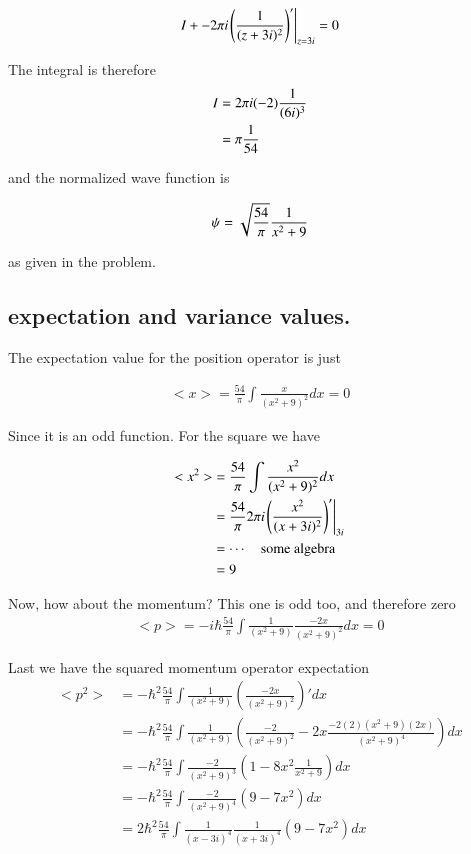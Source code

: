 \documentclass{article}
\begin{document}
\begin{align*}
I + -2 \pi i {\left.\left(\frac{1}{(z + 3i)^2}\right)'\right\vert}_{z=3i} = 0
\end{align*}

The integral is therefore
\begin{align*}
I 
&= 2 \pi i (-2)\frac{1}{(6i)^3} \\
&= \pi \frac{1}{54} \\
\end{align*}

and the normalized wave function is 

\begin{align*}
\psi = \sqrt{\frac{54}{\pi}}\frac{1}{x^2 + 9}
\end{align*}

as given in the problem.

\subsection{ expectation and variance values. }

The expectation value for the position operator is just

\begin{align*}
<x> = \frac{54}{\pi} \int \frac{x}{(x^2 + 9)^2} dx = 0
\end{align*}

Since it is an odd function.  For the square we have

\begin{align*}
<x^2>
&= \frac{54}{\pi} \int \frac{x^2}{(x^2 + 9)^2} dx \\
&= \frac{54}{\pi} 2 \pi i {\left.\left(\frac{x^2}{(x + 3i)^2}\right)'\right\vert}_{3i} \\
&= \cdots \quad \mbox{\text{some algebra}} \\
&= 9
\end{align*}

Now, how about the momentum?  This one is odd too, and therefore zero
\begin{align*}
<p> = -i \hbar \frac{54}{\pi} \int \frac{1}{(x^2 + 9)} \frac{-2x}{(x^2 + 9)^2} dx = 0
\end{align*}

Last we have the squared momentum operator expectation
\begin{align*}
<p^2> 
&= - \hbar^2 \frac{54}{\pi} \int \frac{1}{(x^2 + 9)} \left(\frac{-2x}{(x^2 + 9)^2}\right)' dx \\
&= - \hbar^2 \frac{54}{\pi} \int \frac{1}{(x^2 + 9)} 
\left(\frac{-2}{(x^2 + 9)^2} - {2x}\frac{-2 (2)(x^2+9)(2x)}{(x^2 + 9)^4} \right)
dx \\
&= - \hbar^2 \frac{54}{\pi} \int \frac{-2}{(x^2 + 9)^3} 
\left(1 - {8x^2}\frac{1}{x^2 + 9} \right)
dx \\
&= - \hbar^2 \frac{54}{\pi} \int \frac{-2}{(x^2 + 9)^4} \left(9 - 7x^2 \right) dx \\
&= 2 \hbar^2 \frac{54}{\pi} \int \frac{1}{(x - 3i)^4} \frac{1}{(x + 3i)^4} \left(9 - 7x^2 \right) dx \\
\end{align*}
\end{document}
